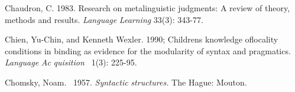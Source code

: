 \begin{styleStandard}
Chaudron, C. 1983. Research on metalinguistic judgments: A review of theory, methods and results. \textit{Language}\textit{ }\textit{Learning}\textit{ }33(3): 343-77.
\end{styleStandard}


\begin{styleStandard}
Chien, Yu-Chin, and Kenneth Wexler. 1990; Children{\textquotesingle}s knowledge oflocality conditions in binding as evidence for the modularity of syntax and pragmatics. \textit{Language}\textit{ }\textit{Ac\-}\textit{ }\textit{quisition }\textit{\ }1(3): 225-95.
\end{styleStandard}


\begin{styleStandard}
{\textquotesingle} Chomsky, Noam. \ 1957. \textit{Syntactic}\textit{ }\textit{structures.}\textit{ }The Hague: Mouton.
\end{styleStandard}


